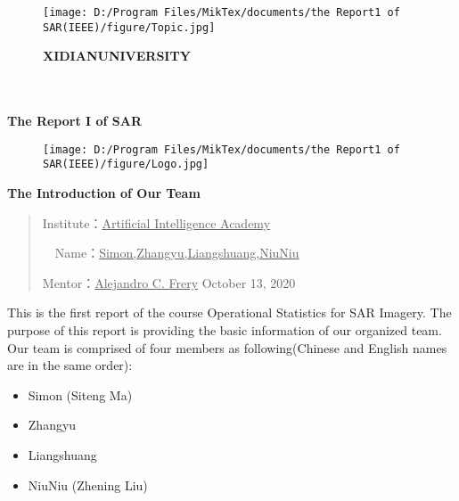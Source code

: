 \documentclass[12pt, journal, onecolumn]{IEEEtran}
\begin{document}
\begin{CJK*}{UTF8}{gbsn}
\begin{figure}[t]
\begin{center}
\texttt{[image: D:/Program Files/MikTex/documents/the Report1 of SAR(IEEE)/figure/Topic.jpg]}
\par\small \textbf{XIDIAN\quad UNIVERSITY} 
\end{center}
\end{figure}

\vskip 3.5cm

\begin{center}
\quad \\
\quad \\
\Large\textbf{The Report I of SAR} 	
\end{center}
	
	
\begin{figure}[h]
\begin{center}
\texttt{[image: D:/Program Files/MikTex/documents/the Report1 of SAR(IEEE)/figure/Logo.jpg]}
\end{center}
\end{figure}

\begin{center}
\LARGE\textbf{The Introduction of Our Team}	
\end{center}
\vskip 2cm
	
\begin{quotation}
\begin{center}
Institute：\underline{Artificial Intelligence Academy}
\par\vskip 0.5cm
\quad \quad \ \ Name：\underline{Simon,Zhangyu,Liangshuang,NiuNiu}
\par\vskip 0.5cm
Mentor：\underline{\quad  Alejandro C. Frery\quad\quad\quad}
\vskip 2cm
\centering
October 13, 2020
\end{center}
\end{quotation}

\newpage
This is the first report of the course Operational Statistics for SAR Imagery. The purpose of this report is providing the basic information of our organized team. Our team is comprised of four members as following(Chinese and English names are in the same order):
\begin{itemize}
\item Simon (Siteng Ma)
\item Zhangyu
\item Liangshuang
\item NiuNiu (Zhening Liu)
\end{itemize}


\end{CJK*}
\end{document}
